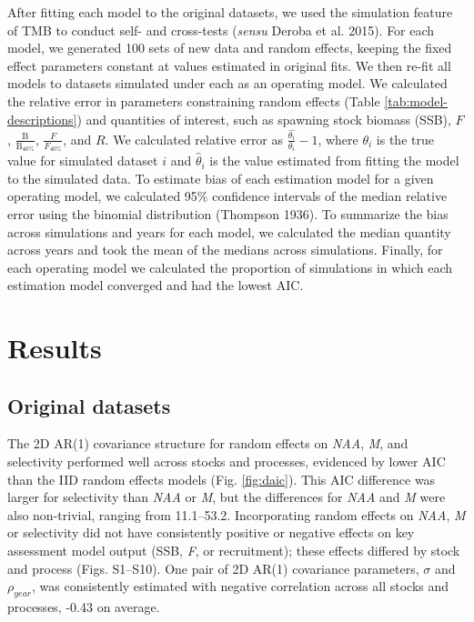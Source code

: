 \documentclass[]{article}
\begin{document}
After fitting each model to the original datasets, we used the
simulation feature of TMB to conduct self- and cross-tests (\emph{sensu}
Deroba et al. 2015). For each model, we generated 100 sets of new data
and random effects, keeping the fixed effect parameters constant at
values estimated in original fits. We then re-fit all models to datasets
simulated under each as an operating model. We calculated the relative
error in parameters constraining random effects (Table
\ref{tab:model-descriptions}) and quantities of interest, such as
spawning stock biomass (SSB), \(F\),
\(\frac{\text{B}}{\text{B}_{40\%}}\), \(\frac{F}{F_{40\%}}\), and \(R\).
We calculated relative error as \(\frac{\hat{\theta_i}}{\theta_i}-1\),
where \(\theta_i\) is the true value for simulated dataset \(i\) and
\(\hat{\theta}_i\) is the value estimated from fitting the model to the
simulated data. To estimate bias of each estimation model for a given
operating model, we calculated 95\% confidence intervals of the median
relative error using the binomial distribution (Thompson 1936). To
summarize the bias across simulations and years for each model, we
calculated the median quantity across years and took the mean of the
medians across simulations. Finally, for each operating model we
calculated the proportion of simulations in which each estimation model
converged and had the lowest AIC.

\hypertarget{results}{%
\section{Results}\label{results}}

\hypertarget{original-datasets}{%
\subsection{Original datasets}\label{original-datasets}}

The 2D AR(1) covariance structure for random effects on \emph{NAA},
\emph{M}, and selectivity performed well across stocks and processes,
evidenced by lower AIC than the IID random effects models (Fig.
\ref{fig:daic}). This AIC difference was larger for selectivity than
\emph{NAA} or \emph{M}, but the differences for \emph{NAA} and \emph{M}
were also non-trivial, ranging from 11.1--53.2. Incorporating random
effects on \emph{NAA}, \emph{M} or selectivity did not have consistently
positive or negative effects on key assessment model output (SSB,
\emph{F}, or recruitment); these effects differed by stock and process
(Figs. S1--S10). One pair of 2D AR(1) covariance parameters, \(\sigma\)
and \(\rho_{year}\), was consistently estimated with negative
correlation across all stocks and processes, -0.43 on average.
\end{document}
